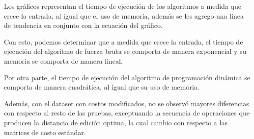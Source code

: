 \begin{enumerate}
\begin{figure}[H]

    \end{figure}

    Los gráficos representan el tiempo de ejecución de los algoritmos
    a medida que crece la entrada, al igual que el uso de memoria, además
    se les agrego una linea de tendencia en conjunto con la ecuación del
    gráfico.

    Con esto, podemos determinar que a medida que crece la entrada,
    el tiempo de ejecución del algoritmo de fuerza bruta 
    se comporta de manera exponencial y su memoria se comporta
    de manera lineal.

    Por otra parte, el tiempo de ejecución del algoritmo de programación
    dinámica se comporta de manera cuadrática, al igual que su uso de 
    memoria.

    Además, con el dataset con costos modificados, no se observó mayores
    diferencias con respecto al resto de las pruebas, exceptuando la secuencia
    de operaciones que producen la distancia de edición optima, la cual
    cambio con respecto a las matrices de costo estándar.


\end{enumerate}















